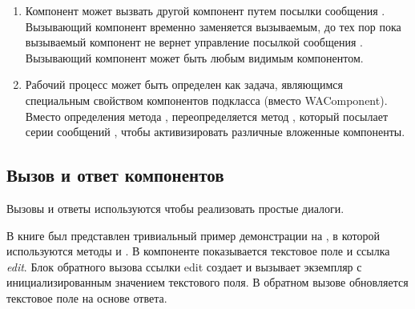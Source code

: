 \documentclass[a4paper,10pt,twoside]{book}
\begin{document}
\begin{enumerate}
\item Компонент может вызвать другой компонент путем посылки сообщения
.
Вызывающий компонент временно заменяется вызываемым,
до тех пор пока вызываемый компонент не вернет управление посылкой
сообщения .
Вызывающий компонент может быть любым видимым компонентом.

\item Рабочий процесс может быть определен как задача,
являющимся специальным свойством компонентов подкласса 
(вместо WAComponent).
Вместо определения метода , переопределяется метод
, который посылает серии сообщений ,
чтобы активизировать различные вложенные компоненты.

\end{enumerate}


\subsection{Вызов и ответ компонентов}


Вызовы и ответы используются чтобы реализовать простые диалоги.


В книге был представлен тривиальный пример демонстрации на
, в которой используются методы  и .
В компоненте  показывается текстовое поле и ссылка
\emph{edit}.
Блок обратного вызова ссылки edit создает и вызывает экземпляр
 с инициализированным значением текстового поля.
В обратном вызове обновляется текстовое поле на основе ответа.
\end{document}
